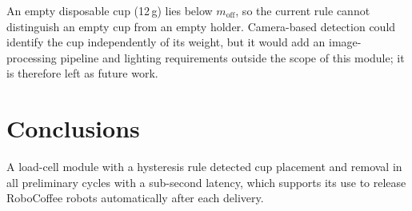 \documentclass[lettersize,journal]{IEEEtran}
\begin{document}
An empty disposable cup (12\,g) lies below
$m_{\mathrm{off}}$, so the current rule cannot distinguish an empty cup from an
empty holder. Camera-based detection could identify the
cup independently of its weight, but it would add an image-processing pipeline and
lighting requirements outside the scope of this module; it is therefore left as
future work.

\section{Conclusions}
\label{sec:conclusions}

A load-cell module with a hysteresis rule detected cup placement and removal in all preliminary cycles with a sub-second latency, which supports its use to release RoboCoffee robots automatically after each delivery.



\end{document}
